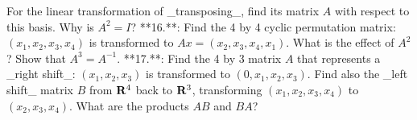 For the linear transformation of _transposing_, find its matrix \(A\) with respect to this basis. Why is \(A^{2}=I\)?
**16.**: Find the 4 by 4 cyclic permutation matrix: \((x_{1},x_{2},x_{3},x_{4})\) is transformed to \(Ax=(x_{2},x_{3},x_{4},x_{1})\). What is the effect of \(A^{2}\)? Show that \(A^{3}=A^{-1}\).
**17.**: Find the 4 by 3 matrix \(A\) that represents a _right shift_: \((x_{1},x_{2},x_{3})\) is transformed to \((0,x_{1},x_{2},x_{3})\). Find also the _left shift_ matrix \(B\) from \({\bf R}^{4}\) back to \({\bf R}^{3}\), transforming \((x_{1},x_{2},x_{3},x_{4})\) to \((x_{2},x_{3},x_{4})\). What are the products \(AB\) and \(BA\)?